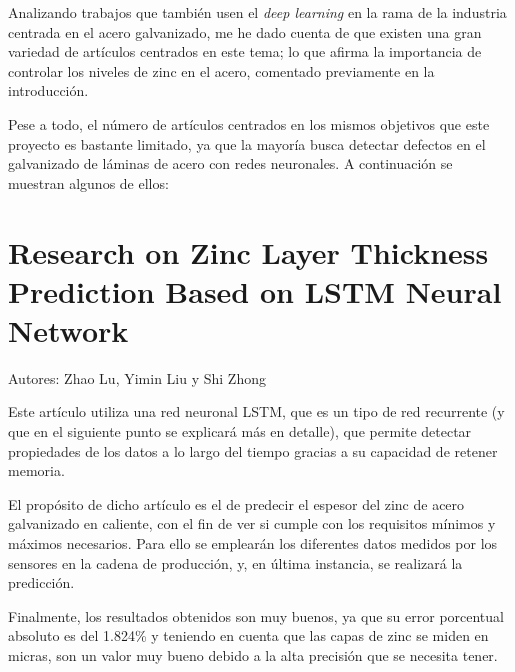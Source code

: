 
Analizando trabajos que también usen el \emph{deep learning} en la rama de la industria centrada en el acero galvanizado, me he dado cuenta de que existen una gran variedad de artículos centrados en este tema; lo que afirma la importancia de controlar los niveles de zinc en el acero, comentado previamente en la introducción. 

Pese a todo, el número de artículos centrados en los mismos objetivos que este proyecto es bastante limitado, ya que la mayoría busca detectar defectos en el galvanizado de láminas de acero con redes neuronales. A continuación se muestran algunos de ellos:
%
%



\section{Research on Zinc Layer Thickness Prediction Based on LSTM Neural Network}
Autores: Zhao Lu, Yimin Liu y Shi Zhong

Este artículo \cite{9602402} utiliza una red neuronal LSTM, que es un tipo de red recurrente (y que en el siguiente punto se explicará más en detalle), que permite detectar propiedades de los datos a lo largo del tiempo gracias a su capacidad de retener memoria.

El propósito de dicho artículo es el de predecir el espesor del zinc de acero galvanizado en caliente, con el fin de ver si cumple con los requisitos mínimos y máximos necesarios. Para ello se emplearán los diferentes datos medidos por los sensores en la cadena de producción, y, en última instancia, se realizará la predicción.

Finalmente, los resultados obtenidos son muy buenos, ya que su error porcentual absoluto es del 1.824\% y teniendo en cuenta que las capas de zinc se miden en micras, son un valor muy bueno debido a la alta precisión que se necesita tener.

